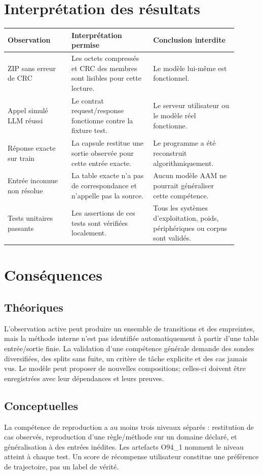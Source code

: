 \documentclass[11pt,a4paper]{article}
\begin{document}
\section{Interprétation des résultats}
\begin{longtable}{p{0.25\linewidth}p{0.32\linewidth}p{0.33\linewidth}}
\toprule
Observation & Interprétation permise & Conclusion interdite \\
\midrule
ZIP sans erreur de CRC & Les octets compressés et CRC des membres sont lisibles pour cette lecture. & Le modèle lui-même est fonctionnel. \\
Appel simulé LLM réussi & Le contrat request/response fonctionne contre la fixture test. & Le serveur utilisateur ou le modèle réel fonctionne. \\
Réponse exacte sur train & La capsule restitue une sortie observée pour cette entrée exacte. & Le programme a été reconstruit algorithmiquement. \\
Entrée inconnue non résolue & La table exacte n'a pas de correspondance et n'appelle pas la source. & Aucun modèle AAM ne pourrait généraliser cette compétence. \\
Tests unitaires passants & Les assertions de ces tests sont vérifiées localement. & Tous les systèmes d'exploitation, poids, périphériques ou corpus sont validés. \\
\bottomrule
\end{longtable}

\section{Conséquences}
\subsection{Théoriques}
L'observation active peut produire un ensemble de transitions et des empreintes, mais la méthode interne n'est pas identifiée automatiquement à partir d'une table entrée/sortie finie. La validation d'une compétence générale demande des sondes diversifiées, des splits sans fuite, un critère de tâche explicite et des cas jamais vus. Le modèle peut proposer de nouvelles compositions; celles-ci doivent être enregistrées avec leur dépendances et leurs preuves.

\subsection{Conceptuelles}
La compétence de reproduction a au moins trois niveaux séparés : restitution de cas observés, reproduction d'une règle/méthode sur un domaine déclaré, et généralisation à des entrées inédites. Les artefacts O94\_1 nomment le niveau atteint à chaque test. Un score de récompense utilisateur constitue une préférence de trajectoire, pas un label de vérité.
\end{document}
